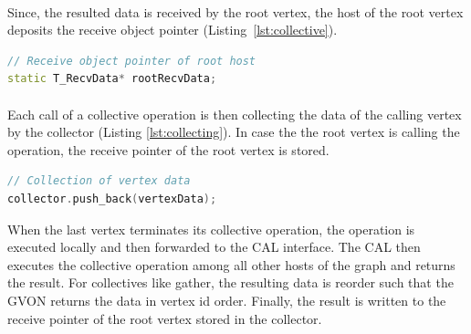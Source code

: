 \paragraph*{}
Since, the resulted data is received by the root vertex, the host of
the root vertex deposits the receive object pointer
(Listing~\ref{lst:collective}).

\begin{lstlisting}[language=C++, label=lst:root]
// Receive object pointer of root host
static T_RecvData* rootRecvData;

\end{lstlisting}

\paragraph*{}
Each call of a collective operation is then collecting the data of the
calling vertex by the collector (Listing \ref{lst:collecting}).  In
case the the root vertex is calling the operation, the receive pointer
of the root vertex is stored.
\begin{lstlisting}[language=C++, label=lst:collecting]
// Collection of vertex data
collector.push_back(vertexData);
\end{lstlisting}


When the last vertex terminates its collective operation, the
operation is executed locally and then forwarded to the CAL
interface. The CAL then executes the collective operation among all
other hosts of the graph and returns the result. For collectives like
gather, the resulting data is reorder such that the GVON returns the
data in vertex id order. Finally, the result is written to the receive
pointer of the root vertex stored in the collector.



